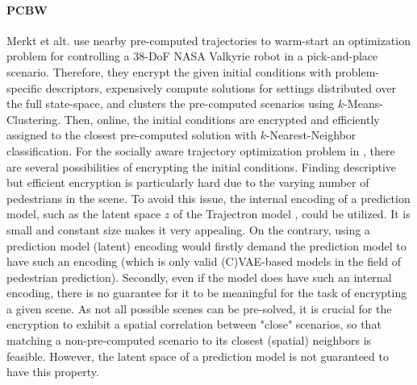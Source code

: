 \paragraph{\ac{PCBW}}
Merkt et alt. \cite{Merkt2018} use nearby pre-computed trajectories to warm-start an optimization problem for controlling a 38-DoF NASA Valkyrie robot in a pick-and-place scenario. Therefore, they encrypt the given initial conditions with problem-specific descriptors, expensively compute solutions for settings distributed over the full state-space, and clusters the pre-computed scenarios using $k$-Means-Clustering. Then, online, the initial conditions are encrypted and efficiently assigned to the closest pre-computed solution with $k$-Nearest-Neighbor classification. 
\newline
For the socially aware trajectory optimization problem in \project, there are several possibilities of encrypting the initial conditions. Finding descriptive but efficient encryption is particularly hard due to the varying number of pedestrians in the scene. To avoid this issue, the internal encoding of a prediction model, such as the latent space $z$ of the Trajectron model \cite{Ivanovic2018}, could be utilized. It is small and constant size makes it very appealing. On the contrary, using a prediction model (latent) encoding would firstly demand the prediction model to have such an encoding (which is only valid (C)\ac{VAE}-based models in the field of pedestrian prediction). Secondly, even if the model does have such an internal encoding, there is no guarantee for it to be meaningful for the task of encrypting a given scene. As not all possible scenes can be pre-solved, it is crucial for the encryption to exhibit a spatial correlation between "close" scenarios, so that matching a non-pre-computed scenario to its closest (spatial) neighbors is feasible. However, the latent space of a prediction model is not guaranteed to have this property. 

